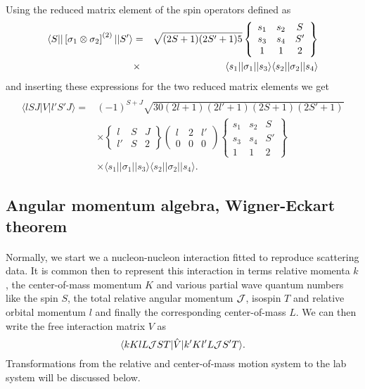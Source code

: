 \documentclass[%
twoside,                 %
final,                   %
10pt]{article}
\begin{document}
\paragraph{}
Using the  reduced matrix element of the spin 
operators defined as
\begin{eqnarray*}
\langle S\vert \vert\left[{\bf \sigma}_1 \otimes {\bf \sigma}_2\right]^{(2)} \vert \vert S' \rangle
& = & 
\sqrt{(2S+1)(2S'+1)5}
\left\{\begin{array}{ccc} s_1&s_2&S \\s_3&s_4&S' \\ 1&1&2\end{array}\right\}\\
&\times& 
\langle s_1 \vert \vert {\bf \sigma}_1 \vert \vert s_3\rangle
\langle s_2 \vert\vert {\bf \sigma}_2 \vert \vert s_4\rangle
\end{eqnarray*}
and inserting  these expressions for the two reduced matrix elements we get 
\[
\begin{array}{ll}
&\\
\langle lSJ\vert V\vert l'S'J\rangle =&(-1)^{S+J}\sqrt{30(2l+1)(2l'+1)(2S+1)(2S'+1)}\\
&\times\left\{\begin{array}{ccc}l&S &J \\l'&S&2\end{array}\right\}
\left(\begin{array}{ccc}l&2&l'\\0&0&0\end{array}\right)
\left\{\begin{array}{ccc}s_{1}&s_{2}&S\\s_{3}&s_{4}&S'\\
1&1&2\end{array}
\right\}\\
&\times\langle s_{1}\vert\vert \sigma_{1}\vert\vert s_{3}\rangle
\langle s_{2}\vert\vert \sigma_{2}\vert \vert s_{4}\rangle.
\end{array}
\]



\subsection*{Angular momentum algebra, Wigner-Eckart theorem}

\paragraph{}
Normally, we start we a nucleon-nucleon interaction fitted to reproduce scattering data.
It is common then to represent this interaction in terms relative momenta $k$, the center-of-mass momentum $K$
and various partial wave quantum numbers like the spin $S$, the total relative angular  momentum ${\cal J}$, isospin $T$ and relative orbital momentum $l$ and finally the corresponding center-of-mass $L$.  
We can then write the  free interaction matrix $V$ as
\[
    \langle kKlL{\cal J}ST\vert\hat{V}\vert k'Kl'L{\cal J}S'T\rangle.
\]
Transformations from the relative and center-of-mass motion
system to the lab system will be discussed
below.
\end{document}
